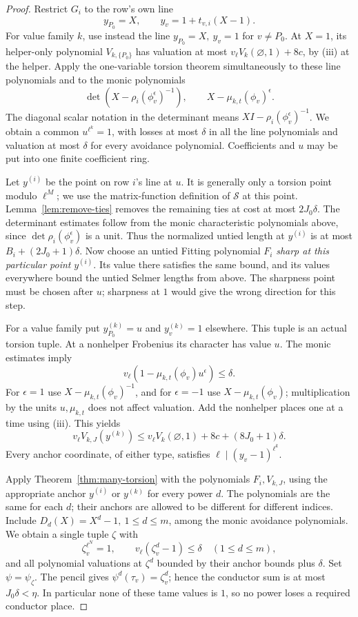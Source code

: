 \documentclass[11pt,a4paper]{article}
\theoremstyle{definition}
\begin{document}
\begin{proof}
Restrict \(G_i\) to the row's own line
\[
 y_{P_0}=X,\qquad y_v=1+t_{v,i}(X-1).
\]
For value family \(k\), use instead the line
\(y_{P_0}=X,\ y_v=1\) for \(v\ne P_0\).
At \(X=1\), its helper-only polynomial
\(V_{k,\{P_0\}}\) has valuation at most
\(v_\ell V_k(\varnothing,1)+8c\), by (iii)
at the helper. Apply the one-variable
torsion theorem simultaneously to these line
polynomials and to the monic polynomials
\[
 \det(X-\rho_i(\phi_v^\epsilon)^{-1}),\qquad
 X-\mu_{k,t}(\phi_v)^\epsilon .
\]
The diagonal scalar notation in the determinant
means \(XI-\rho_i(\phi_v^\epsilon)^{-1}\).
We obtain a common \(u^{\ell^k}=1\), with losses
at most \(\delta\) in all the line polynomials
and valuation at most \(\delta\) for every
avoidance polynomial. Coefficients and \(u\)
may be put into one finite coefficient ring.

Let \(y^{(i)}\) be the point on row \(i\)'s line
at \(u\). It is generally only a torsion point
modulo \(\ell^M\); we use the matrix-function
definition of \(\mathcal S\) at this point.
Lemma~\ref{lem:remove-ties} removes the remaining
ties at cost at most \(2J_0\delta\).
The determinant estimates follow from the monic
characteristic polynomials above, since
\(\det\rho_i(\phi_v^\epsilon)\) is a unit.
Thus the normalized untied length at \(y^{(i)}\)
is at most
\(B_i+(2J_0+1)\delta\).
Now choose an untied Fitting polynomial \(F_i\)
\emph{sharp at this particular point}
\(y^{(i)}\). Its value there satisfies the same
bound, and its values everywhere bound the
untied Selmer lengths from above. The sharpness
point must be chosen after \(u\); sharpness at
\(1\) would give the wrong direction for this step.

For a value family put \(y^{(k)}_{P_0}=u\) and
\(y^{(k)}_v=1\) elsewhere. This tuple is an actual
torsion tuple. At a nonhelper Frobenius its
character has value \(u\).
The monic estimates imply
\[
 v_\ell(1-\mu_{k,t}(\phi_v)u^\epsilon)\le\delta.
\]
For \(\epsilon=1\) use
\(X-\mu_{k,t}(\phi_v)^{-1}\), and for
\(\epsilon=-1\) use \(X-\mu_{k,t}(\phi_v)\);
multiplication by the units \(u,\mu_{k,t}\)
does not affect valuation. Add the nonhelper
places one at a time using (iii). This yields
\[
 v_\ell V_{k,J}(y^{(k)})
 \le v_\ell V_k(\varnothing,1)+8c+
                         (8J_0+1)\delta.
\]
Every anchor coordinate, of either type, satisfies
\(\ell\mid(y_v-1)^{\ell^k}\).

Apply Theorem~\ref{thm:many-torsion} with the
polynomials \(F_i,V_{k,J}\), using the appropriate
anchor \(y^{(i)}\) or \(y^{(k)}\) for every power
\(d\). The polynomials are the same for each
\(d\); their anchors are allowed to be different
for different indices. Include
\(D_d(X)=X^d-1,\ 1\le d\le m\), among the
monic avoidance polynomials.
We obtain a single tuple \(\zeta\) with
\[
 \zeta_v^{\ell^N}=1,\qquad
 v_\ell(\zeta_v^d-1)\le\delta\quad(1\le d\le m),
\]
and all polynomial valuations at \(\zeta^d\)
bounded by their anchor bounds plus \(\delta\).
Set \(\psi=\psi_\zeta\).
The pencil gives
\(\psi^d(\tau_v)=\zeta_v^d\);
hence the conductor sum is at most
\(J_0\delta<\eta\).
In particular none of these tame values is
\(1\), so no power loses a required conductor
place.


\end{proof}
\end{document}

